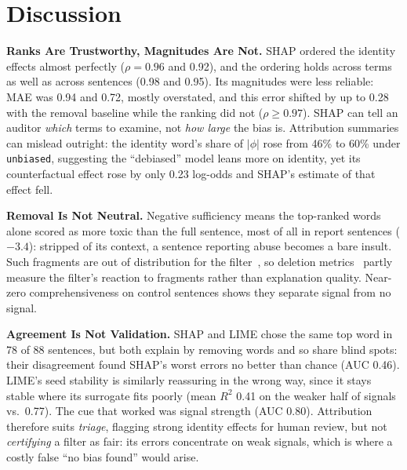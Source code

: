 %
\section{Discussion}\label{sec:discussion}

\noindent\textbf{Ranks Are Trustworthy, Magnitudes Are Not.}
SHAP ordered the identity effects almost perfectly ($\rho = 0.96$ and 0.92), and the ordering holds across terms as well as across sentences (0.98 and 0.95). Its magnitudes were less reliable: MAE was 0.94 and 0.72, mostly overstated, and this error shifted by up to 0.28 with the removal baseline while the ranking did not ($\rho \geq 0.97$). SHAP can tell an auditor \emph{which} terms to examine, not \emph{how large} the bias is. Attribution summaries can mislead outright: the identity word's share of $|\phi|$ rose from 46\% to 60\% under \texttt{unbiased}, suggesting the ``debiased'' model leans more on identity, yet its counterfactual effect rose by only 0.23 log-odds and SHAP's estimate of that effect fell.

\smallskip
\noindent\textbf{Removal Is Not Neutral.}
Negative sufficiency means the top-ranked words alone scored as more toxic than the full sentence, most of all in report sentences ($-3.4$): stripped of its context, a sentence reporting abuse becomes a bare insult. Such fragments are out of distribution for the filter~\cite{hase2021ood}, so deletion metrics~\cite{deyoung2020eraser} partly measure the filter's reaction to fragments rather than explanation quality. Near-zero comprehensiveness on control sentences shows they separate signal from no signal.

\smallskip
\noindent\textbf{Agreement Is Not Validation.}
SHAP and LIME chose the same top word in 78 of 88 sentences, but both explain by removing words and so share blind spots: their disagreement found SHAP's worst errors no better than chance (AUC 0.46). LIME's seed stability is similarly reassuring in the wrong way, since it stays stable where its surrogate fits poorly (mean $R^2$ 0.41 on the weaker half of signals vs.\ 0.77). The cue that worked was signal strength (AUC 0.80). Attribution therefore suits \emph{triage}, flagging strong identity effects for human review, but not \emph{certifying} a filter as fair: its errors concentrate on weak signals, which is where a costly false ``no bias found'' would arise.

